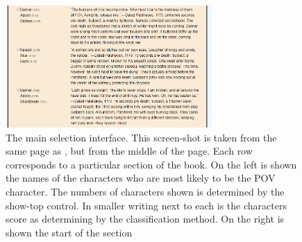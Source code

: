\documentclass[11pt,a4paper]{article}
\begin{document}
\begin{figure}
	\centering
	\includegraphics[width=0.7\textwidth]{classmiddle}
	\caption{The main selection interface.
		This screen-shot is taken from the same page as ,
		but from the middle of the page.
		Each row corresponds to a particular section of the book.
		On the left is shown the names of the characters who are most likely to be the POV character.
		The numbers of characters shown is determined by the show-top control.
		In smaller writing next to each is the characters score as determining by the classification method.
		On the right is shown the start of the section
	}
	\label{fig:classmid}
\end{figure}
\end{document}

